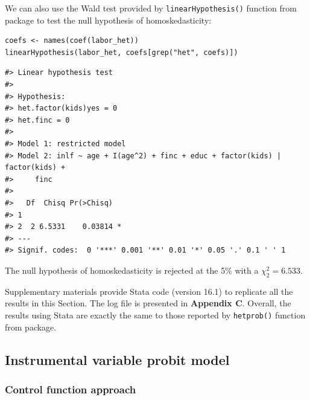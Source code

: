 We can also use the Wald test provided by \texttt{linearHypothesis()} function from  package to test the null hypothesis of homoskedasticity:

\begin{verbatim}
coefs <- names(coef(labor_het))
linearHypothesis(labor_het, coefs[grep("het", coefs)])
\end{verbatim}

\begin{verbatim}
#> Linear hypothesis test
#> 
#> Hypothesis:
#> het.factor(kids)yes = 0
#> het.finc = 0
#> 
#> Model 1: restricted model
#> Model 2: inlf ~ age + I(age^2) + finc + educ + factor(kids) | factor(kids) + 
#>     finc
#> 
#>   Df  Chisq Pr(>Chisq)  
#> 1                       
#> 2  2 6.5331    0.03814 *
#> ---
#> Signif. codes:  0 '***' 0.001 '**' 0.01 '*' 0.05 '.' 0.1 ' ' 1
\end{verbatim}

The null hypothesis of homoskedasticity is rejected at the 5\% with a \(\chi_2^2 = 6.533\).

Supplementary materials provide Stata code (version 16.1) to replicate all the results in this Section. The log file is presented in \textbf{Appendix C}. Overall, the results using Stata are exactly the same to those reported by \texttt{hetprob()} function from  package.

\hypertarget{instrumental-variable-probit-model}{%
\subsection{Instrumental variable probit model}\label{instrumental-variable-probit-model}}

\hypertarget{control-function-approach}{%
\subsubsection{Control function approach}\label{control-function-approach}}

